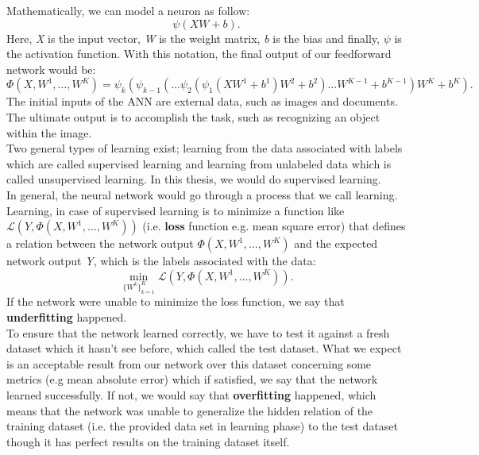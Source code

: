 Mathematically, we can model a neuron as follow:
\begin{equation}
\psi(XW+b).
\end{equation} 
Here, \textit{X} is the input vector, \textit{W} is the weight matrix, \textit{b} is the bias and finally, $\psi$ is the activation function. With this notation, the final output of our feedforward network would be:
\begin{equation}
\Phi(X,W^1,\dots,W^K) = \psi_{k}(\psi_{k-1}(\dots \psi_{2}(\psi_{1}(XW^1+b^1)W^2+b^2)\dots W^{K-1}+b^{K-1})W^{K}+b^{K}).
\end{equation}
The initial inputs of the ANN are external data, such as images and documents. The ultimate output is to accomplish the task, such as recognizing an object within the image.\\
Two general types of learning exist; learning from the data associated with labels which are called supervised learning and learning from unlabeled data which is called unsupervised learning. In this thesis, we would do supervised learning. \\
In general, the neural network would go through a process that we call learning. Learning, in case of supervised learning is to minimize a function like $ \mathscr{L}(Y, \Phi(X, W^1,\dots, W^K))$ (i.e. \textbf{loss} function e.g. mean square error) that defines a relation between the network output $\Phi(X, W^1,\dots, W^K)$ and the expected network output \textit{Y}, which is the labels associated with the data:
\begin{equation}
\min_{\{W^k\}_{k=1}^{K}} \mathscr{L}(Y, \Phi(X,W^1,\dots,W^K)).
\end{equation}
If the network were unable to minimize the loss function, we say that \textbf{underfitting} happened.\\
To ensure that the network learned correctly, we have to test it against a fresh dataset which it hasn't see before, which called the test dataset. What we expect is an acceptable result from our network over this dataset concerning some metrics (e.g mean absolute error) which if satisfied, we say that the network learned successfully. If not, we would say that \textbf{overfitting} happened, which means that the network was unable to generalize the hidden relation of the training dataset (i.e. the provided data set in learning phase) to the test dataset though it has perfect results on the training dataset itself.\\
